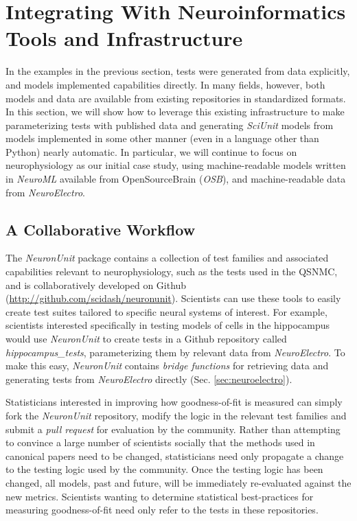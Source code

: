 \documentclass{frontiersSCNS}
\begin{document}
\section{Integrating With Neuroinformatics Tools and Infrastructure}\label{sec:neuronunit}
In the examples in the previous section, tests were generated from data explicitly, and models implemented capabilities directly. In many fields, however, both models and data are available from existing  repositories in standardized formats. In this section, we will show how to leverage this existing infrastructure to make parameterizing tests with published data and generating \textit{SciUnit} models from models implemented in some other manner (even in a language other than Python) nearly automatic. In particular, we will continue to focus on neurophysiology as our initial case study, using machine-readable models written in \textit{NeuroML} available from OpenSourceBrain (\textit{OSB}), and machine-readable data from \textit{NeuroElectro}. 

\subsection{A Collaborative Workflow}\label{sec:neuronunit_acitivities}
The \textit{NeuronUnit} package contains a collection of test families and associated capabilities  relevant to neurophysiology, such as the tests used in the QSNMC, and is collaboratively developed on Github (\url{http://github.com/scidash/neuronunit}). Scientists can use these tools to easily create test suites tailored to specific neural systems of interest. For example, scientists interested specifically in testing models of cells in the hippocampus would use \textit{NeuronUnit} to create tests in a Github repository called \textit{hippocampus\_tests},  parameterizing them by relevant data from \textit{NeuroElectro}. To make this easy, \textit{NeuronUnit} contains \emph{bridge functions} for retrieving data and generating tests from \textit{NeuroElectro} directly (Sec. \ref{sec:neuroelectro}). 

Statisticians interested in improving how goodness-of-fit is measured can simply fork the \textit{NeuronUnit} repository, modify the logic in the relevant test families and submit a \emph{pull request} for evaluation by the community. Rather than attempting to convince a large number of scientists socially that the methods used in canonical papers need to be changed, statisticians need only propagate a change to the testing logic used by the community. Once the testing logic has been changed, all models, past and future, will be immediately re-evaluated against the new metrics. Scientists wanting to determine statistical best-practices for measuring goodness-of-fit need only refer to the tests in these repositories.
\end{document}
